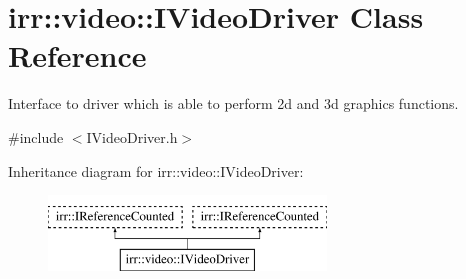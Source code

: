 \hypertarget{classirr_1_1video_1_1IVideoDriver}{}\section{irr\+:\+:video\+:\+:I\+Video\+Driver Class Reference}
\label{classirr_1_1video_1_1IVideoDriver}


Interface to driver which is able to perform 2d and 3d graphics functions.  




{\ttfamily \#include $<$I\+Video\+Driver.\+h$>$}

Inheritance diagram for irr\+:\+:video\+:\+:I\+Video\+Driver\+:\begin{figure}[H]
\begin{center}
\leavevmode
\includegraphics[height=2.000000cm]{classirr_1_1video_1_1IVideoDriver}
\end{center}
\end{figure}
